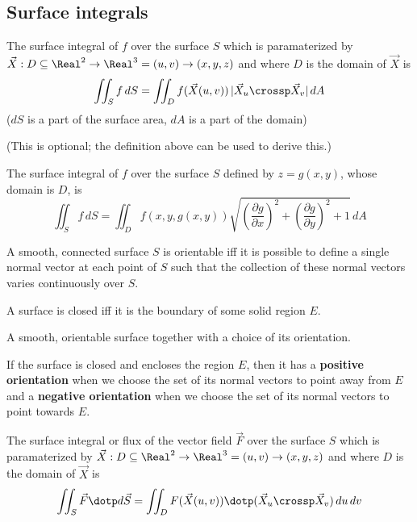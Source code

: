 \subsection{Surface integrals}

\begin{definition}
  The surface integral of $f$ over the surface $S$ which is paramaterized by $\vec{X} : D \subseteq \Real^2 \to \Real^3 = (u, v) \to (x, y, z)$ and where $D$ is the domain of $\vec{X}$ is
  \[
    \iint_S f \,dS = \iint_D f(\vec{X}(u, v)) \, |\vec{X}_u \crossp \vec{X}_v| \,dA
  \]
  ($dS$ is a part of the surface area, $dA$ is a part of the domain)
\end{definition}

\begin{definition}
  (This is optional; the definition above can be used to derive this.)

  The surface integral of $f$ over the surface $S$ defined by $z = g(x, y)$, whose domain is $D$, is
  \[
    \iint_S f \,dS = \iint_D f(x, y, g(x, y)) \sqrt{\left(\frac{\partial g}{\partial x}\right)^2 + \left(\frac{\partial g}{\partial y}\right)^2 + 1} \,dA
  \]
\end{definition}

\begin{definition}
  A smooth, connected surface $S$ is orientable iff it is possible to define a single normal vector at each point of $S$ such that the collection of these normal vectors varies continuously over $S$.
\end{definition}

\begin{definition}
  A surface is closed iff it is the boundary of some solid region $E$.
\end{definition}

\begin{definition}
  A smooth, orientable surface together with a choice of its orientation.

  If the surface is closed and encloses the region $E$, then it has a \textbf{positive orientation} when we choose the set of its normal vectors to point away from $E$ and a \textbf{negative orientation} when we choose the set of its normal vectors to point towards $E$.
\end{definition}

\begin{definition}
  The surface integral or flux of the vector field $\vec{F}$ over the surface $S$ which is paramaterized by $\vec{X} : D \subseteq \Real^2 \to \Real^3 = (u, v) \to (x, y, z)$ and where $D$ is the domain of $\vec{X}$ is
  \[
    \iint_S \vec{F} \dotp d\vec{S} = \iint_D F(\vec{X}(u, v)) \dotp (\vec{X}_u \crossp \vec{X}_v) \,du \, dv
  \]
\end{definition}

